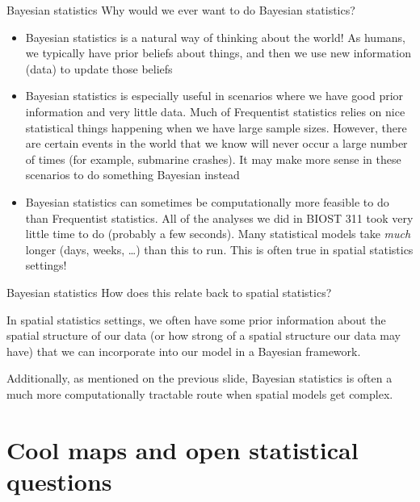 \documentclass[10pt,t]{beamer}
\begin{document}
\begin{frame}{Bayesian statistics}
Why would we ever want to do Bayesian statistics?

\vspace{0.3cm}

\begin{itemize}
	\item Bayesian statistics is a natural way of thinking about the world! As humans, we typically have prior beliefs about things, and then we use new information (data) to update those beliefs
	\item \pause Bayesian statistics is especially useful in scenarios where we have good prior information and very little data. Much of Frequentist statistics relies on nice statistical things happening when we have large sample sizes. However, there are certain events in the world that we know will never occur a large number of times (for example, submarine crashes). It may make more sense in these scenarios to do something Bayesian instead
	\item \pause Bayesian statistics can sometimes be computationally more feasible to do than Frequentist statistics. All of the analyses we did in BIOST 311 took very little time to do (probably a few seconds). Many statistical models take \textit{much} longer (days, weeks, \dots) than this to run. This is often true in spatial statistics settings!
\end{itemize}
\end{frame}

\begin{frame}{Bayesian statistics}
How does this relate back to spatial statistics? \pause

\vspace{0.3cm}

In spatial statistics settings, we often have some prior information about the spatial structure of our data (or how strong of a spatial structure our data may have) that we can incorporate into our model in a Bayesian framework. \pause

\vspace{0.3cm}

Additionally, as mentioned on the previous slide, Bayesian statistics is often a much more computationally tractable route when spatial models get complex.
\end{frame}

\section{Cool maps and open statistical questions}
\end{document}
